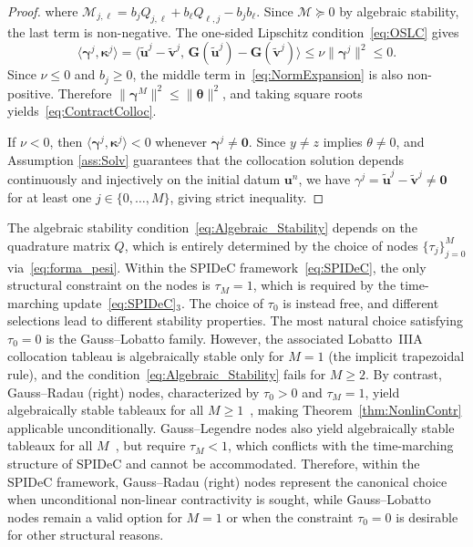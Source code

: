 \documentclass[a4paper,num-refs]{oup-contemporary-spidec}
\begin{document}
\begin{proof}
    where $\mathcal{M}_{j,\ell} 
    = b_j Q_{j,\ell} + b_\ell Q_{\ell,j} - b_j b_\ell$.
    Since $\mathcal{M}\succcurlyeq 0$ by algebraic 
    stability, the last term is non-negative. The 
    one-sided Lipschitz condition~\eqref{eq:OSLC} gives
    \[
        \langle\bm{\gamma}^j,\bm{\kappa}^j\rangle
        = \langle\tilde{\bm{u}}^j - \tilde{\bm{v}}^j,\,
                  \bm{G}(\tilde{\bm{u}}^j)
                  - \bm{G}(\tilde{\bm{v}}^j)\rangle
        \leq \nu\|\bm{\gamma}^j\|^2 \leq 0.
    \]
    Since $\nu\leq 0$ and $b_j\geq 0$, the middle term 
    in~\eqref{eq:NormExpansion} is also non-positive. 
    Therefore $\|\bm{\gamma}^M\|^2 \leq \|\bm{\theta}\|^2$, 
    and taking square roots yields~\eqref{eq:ContractColloc}.
    
    If $\nu<0$, then $\langle\bm{\gamma}^j,\bm{\kappa}^j\rangle < 0$ whenever $\bm{\gamma}^j\neq\bm{0}$. Since $y \neq z$ implies $\theta \neq 0$, and Assumption \ref{ass:Solv} guarantees that the collocation 
solution depends continuously and injectively on 
the initial datum $\bm{u}^n$, we have 
$\gamma^j = \tilde{\bm{u}}^j - \tilde{\bm{v}}^j 
\neq \bm{0}$ for at least one $j\in\{0,\dots,M\}$, 
giving strict inequality.
\end{proof}

The algebraic stability condition~\eqref{eq:Algebraic_Stability} depends on the quadrature matrix $Q$, which is entirely determined by the choice of nodes $\{\tau_j\}_{j=0}^M$ via~\eqref{eq:forma_pesi}. Within the SPIDeC framework~\eqref{eq:SPIDeC}, the only structural constraint on the nodes is $\tau_M=1$, which is required by the time-marching update~\eqref{eq:SPIDeC}$_3$. The choice of $\tau_0$ is instead free, and different selections lead to different stability properties. The most natural choice satisfying $\tau_0=0$ is the Gauss--Lobatto family. However, the associated Lobatto~IIIA collocation tableau is algebraically stable only for $M=1$ (the implicit trapezoidal rule), and the condition~\eqref{eq:Algebraic_Stability} fails for $M\geq 2.$ By contrast, Gauss--Radau (right) nodes, characterized by $\tau_0>0$ and $\tau_M=1$, yield algebraically stable tableaux for all $M\geq 1$~\cite[Theorem~359C]{Butcher}, making Theorem~\ref{thm:NonlinContr} applicable unconditionally. Gauss--Legendre nodes also yield algebraically stable tableaux for all $M$~\cite[Chapter~IV.12]{Hairer_1996}, but require $\tau_M<1$, which conflicts with the time-marching structure of SPIDeC and cannot be accommodated. Therefore, within the SPIDeC framework, Gauss--Radau (right) nodes represent the canonical choice when unconditional non-linear contractivity is sought, while Gauss--Lobatto nodes remain a valid option for $M=1$ or when the constraint $\tau_0=0$ is desirable for other structural reasons. 
\end{document}
